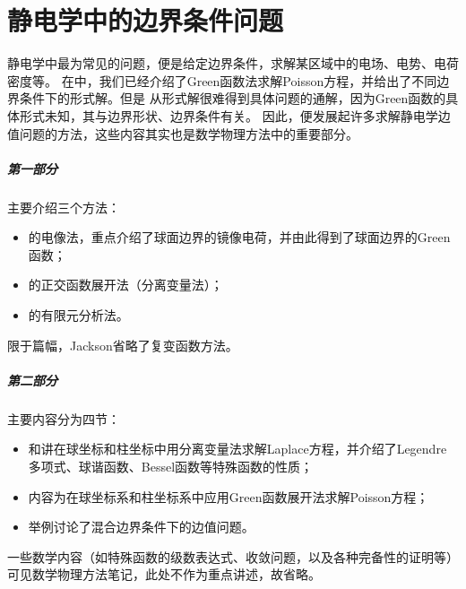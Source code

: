 \chapter{静电学中的边界条件问题}
\label{chap:boundary-value problems}

静电学中最为常见的问题，便是给定边界条件，求解某区域中的电场、电势、电荷密度等。
在中，我们已经介绍了Green函数法求解Poisson方程，并给出了不同边界条件下的形式解。但是%
从形式解很难得到具体问题的通解，因为Green函数的具体形式未知，其与边界形状、边界条件有关。%
因此，便发展起许多求解静电学边值问题的方法，这些内容其实也是数学物理方法中的重要部分。


\paragraph{第一部分}

主要介绍三个方法：
\begin{itemize}
    \item {}的电像法，重点介绍了球面边界的镜像电荷，并由此得到了球面边界的Green函数；
    \item {}的正交函数展开法（分离变量法）；
    \item {}的有限元分析法。
\end{itemize}
限于篇幅，Jackson省略了复变函数方法。%

\paragraph{第二部分}
主要内容分为四节：
\begin{itemize}
    \item {}和讲在球坐标和柱坐标中用分离变量法求解Laplace方程，并介绍了Legendre多项式、球谐函数、Bessel函数等特殊函数的性质；
    \item {}内容为在球坐标系和柱坐标系中应用Green函数展开法求解Poisson方程；
    \item {}举例讨论了混合边界条件下的边值问题。
\end{itemize}
一些数学内容（如特殊函数的级数表达式、收敛问题，以及各种完备性的证明等）可见数学物理方法笔记，此处不作为重点讲述，故省略。

